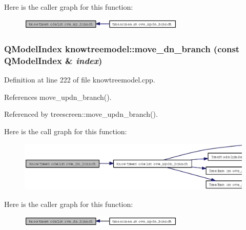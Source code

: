Here is the caller graph for this function:\begin{figure}[H]
\begin{center}
\leavevmode
\includegraphics[width=223pt]{classknowtreemodel_dde544e3e416a51e6e132fa2f07426f8_icgraph}
\end{center}
\end{figure}
\subsubsection{\setlength{\rightskip}{0pt plus 5cm}QModel\-Index knowtreemodel::move\_\-dn\_\-branch (const QModel\-Index \& {\em index})}\label{classknowtreemodel_d9fc7fb894fad944f7e02556ddfa375e}




Definition at line 222 of file knowtreemodel.cpp.

References move\_\-updn\_\-branch().

Referenced by treescreen::move\_\-updn\_\-branch().

Here is the call graph for this function:\begin{figure}[H]
\begin{center}
\leavevmode
\includegraphics[width=396pt]{classknowtreemodel_d9fc7fb894fad944f7e02556ddfa375e_cgraph}
\end{center}
\end{figure}


Here is the caller graph for this function:\begin{figure}[H]
\begin{center}
\leavevmode
\includegraphics[width=223pt]{classknowtreemodel_d9fc7fb894fad944f7e02556ddfa375e_icgraph}
\end{center}
\end{figure}
